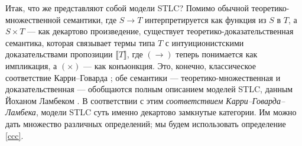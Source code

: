Итак, что же представляют собой модели STLC? Помимо
обычной теоретико-множественной семантики, где $S\to T$
интерпретируется как функция из $S$ в $T$, а
$S\times T$ --- как декартово произведение, существует
теоретико-доказательственная семантика, которая
связывает термы типа $T$ с интуиционистскими
доказательствами пропозиции $\llbracket T\rrbracket$,
где $(\to)$ теперь понимается как импликация, а
$(\times)$ --- как конъюнкция. Это, конечно,
классическое соответствие Карри--Говарда \cite{ho80};
обе семантики --- теоретико-множественная и
доказательственная --- обобщаются полным описанием
моделей STLC, данным Йоханом Ламбеком
\cite{Lambek1980}. В соответствии с этим
\textit{соответствием Карри--Говарда--Ламбека}, модели
STLC суть именно декартово замкнутые категории. Им
можно дать множество различных определений; мы будем
использовать определение \ref{ccc}.

